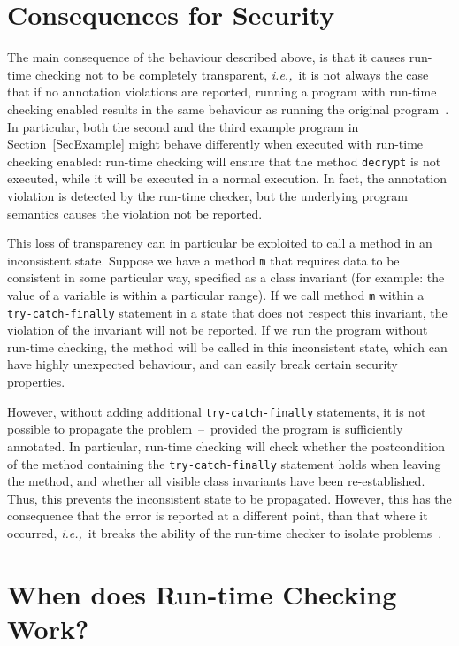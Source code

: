 \documentclass[]{llncs}
\begin{document}
\section{Consequences for Security}\label{SecExploiting}

The main consequence of the behaviour described above, is that it
causes run-time checking not to be completely transparent,
\emph{i.e.,}\ it is not always the case that if no annotation
violations are reported, running a program with run-time checking
enabled results in the same behaviour as running the original
program~\cite{BurdyCCEKLLP03}. In particular, both the second and the
third example program in Section~\ref{SecExample} might behave differently
when executed with run-time checking enabled: run-time checking will
ensure that the method \texttt{decrypt} is not executed, while it will
be executed in a normal execution. In fact, the annotation violation is
detected by the run-time checker, but the underlying program semantics
causes the violation not be reported.

This loss of transparency can in particular be exploited to call a
method in an inconsistent state. Suppose we have a method \texttt{m}
that requires data to be consistent in some particular way, specified
as a class invariant (for example: the value of a variable is within a
particular range). If we call method
\texttt{m} within a \texttt{try-catch-finally} statement in a state that
does not respect this invariant, the violation of the invariant will
not be reported. If we run the program without run-time checking, the
method will be called in this inconsistent state, which can have
highly unexpected behaviour, and can easily break certain security
properties. 

However, without adding additional \texttt{try-catch-finally}
statements, it is not possible to propagate the problem~--~provided
the program is sufficiently annotated. In particular, run-time
checking will check whether the postcondition of the method containing
the \texttt{try-catch-finally} statement holds when leaving the
method, and whether all visible class invariants have been
re-established. Thus, this prevents the inconsistent state to be
propagated. However, this has the consequence that the error is
reported at a different point, than that where it occurred,
\emph{i.e.,}\ it breaks the ability of the run-time checker to isolate
problems~\cite{BurdyCCEKLLP03}.  

\section{When does Run-time Checking Work?}\label{SecAvoiding} 
\end{document}
